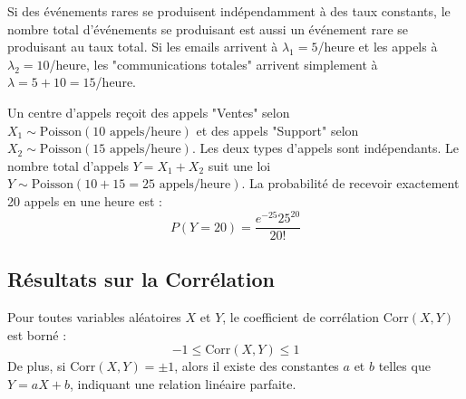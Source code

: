 \begin{intuitionbox}
Si des événements rares se produisent indépendamment à des taux constants, le nombre total d'événements se produisant est aussi un événement rare se produisant au taux total. Si les emails arrivent à $\lambda_1=5$/heure et les appels à $\lambda_2=10$/heure, les "communications totales" arrivent simplement à $\lambda = 5+10 = 15$/heure.
\end{intuitionbox}

\begin{examplebox}
Un centre d'appels reçoit des appels "Ventes" selon $X_1 \sim \text{Poisson}(10 \text{ appels/heure})$ et des appels "Support" selon $X_2 \sim \text{Poisson}(15 \text{ appels/heure})$. Les deux types d'appels sont indépendants.
Le nombre total d'appels $Y = X_1 + X_2$ suit une loi $Y \sim \text{Poisson}(10+15=25 \text{ appels/heure})$.
La probabilité de recevoir exactement 20 appels en une heure est :
$$ P(Y=20) = \frac{e^{-25} 25^{20}}{20!} $$
\end{examplebox}

\subsection{Résultats sur la Corrélation}

\begin{theorembox}
Pour toutes variables aléatoires $X$ et $Y$, le coefficient de corrélation $\text{Corr}(X,Y)$ est borné :
$$ -1 \le \text{Corr}(X,Y) \le 1 $$
De plus, si $\text{Corr}(X,Y) = \pm 1$, alors il existe des constantes $a$ et $b$ telles que $Y = aX + b$, indiquant une relation linéaire parfaite.
\end{theorembox}

